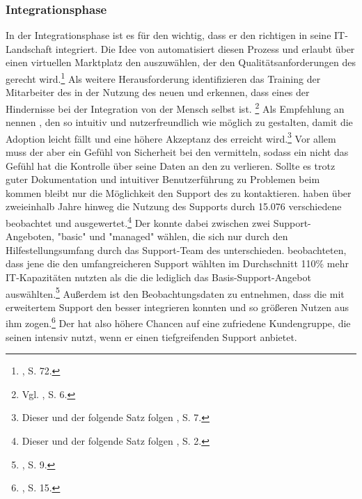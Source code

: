 \subsubsection{Integrationsphase}
In der Integrationsphase ist es für den \CSU wichtig, dass er den richtigen \CS in seine IT-Landschaft integriert. Die Idee von \cite{Nallur.2012} automatisiert diesen Prozess und erlaubt \CSUn über einen virtuellen Marktplatz den \CS auszuwählen, der den Qualitätsanforderungen des \CSUs gerecht wird.\footnote{\cite{Nallur.2012}, S. 72.}
\newline
Als weitere Herausforderung identifizieren \cite{Conboy.2012} das Training der Mitarbeiter des \CSUs in der Nutzung des neuen \CSs und erkennen, dass eines der Hindernisse bei der Integration von \CC der Mensch selbst ist. \footnote{Vgl. \cite{Conboy.2012}, S. 6.}
Als Empfehlung an \CSP nennen \cite{Conboy.2012}, den \CS so intuitiv und nutzerfreundlich wie möglich zu gestalten, damit die Adoption leicht fällt und eine höhere Akzeptanz des \CSs erreicht wird.\footnote{Dieser und der folgende Satz folgen \cite{Conboy.2012}, S. 7.}
Vor allem muss der \CSP aber ein Gefühl von Sicherheit bei den \CSUn vermitteln, sodass ein \CSU nicht das Gefühl hat die Kontrolle über seine Daten an den \CSP zu verlieren.
\newline
Sollte es trotz guter Dokumentation und intuitiver Benutzerführung zu Problemen beim \CSU kommen bleibt nur die Möglichkeit den Support des \CSPs zu kontaktieren.
\cite{Retana.2012} haben über zweieinhalb Jahre hinweg die Nutzung des \CSP Supports durch 15.076 verschiedene \CSU beobachtet und ausgewertet.\footnote{Dieser und der folgende Satz folgen \cite{Retana.2012}, S. 2.}
Der \CSU konnte dabei zwischen zwei Support-Angeboten, "basic" und "managed" wählen, die sich nur durch den Hilfestellungsumfang durch das Support-Team des \CSPs unterschieden.
\cite{Retana.2012} beobachteten, dass jene \CSUComma die den umfangreicheren Support wählten im Durchschnitt 110\% mehr IT-Kapazitäten nutzten als die \CSU die lediglich das Basis-Support-Angebot auswählten.\footnote{\cite{Retana.2012}, S. 9.}
Außerdem ist den Beobachtungsdaten zu entnehmen, dass die \CSU mit erweitertem Support den \CS besser integrieren konnten und so größeren Nutzen aus ihm zogen.\footnote{\cite{Retana.2012}, S. 15.}
Der \CSP hat also höhere Chancen auf eine zufriedene Kundengruppe, die seinen \CS intensiv nutzt, wenn er einen tiefgreifenden Support anbietet.
\newline
\newline
